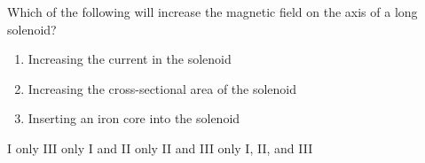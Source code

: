 
\begin{questions}
\setcounter{question}{12}

\question
Which of the following will increase the magnetic field on the axis of a long solenoid?

\begin{enumerate}
    \item Increasing the current in the solenoid
    \item Increasing the cross-sectional area of the solenoid
    \item Inserting an iron core into the solenoid
\end{enumerate}

\begin{oneparchoices}
    \choice I only
    \choice III only
    \choice I and II only
    \choice II and III only
    \choice I, II, and III
\end{oneparchoices}
\end{questions}
